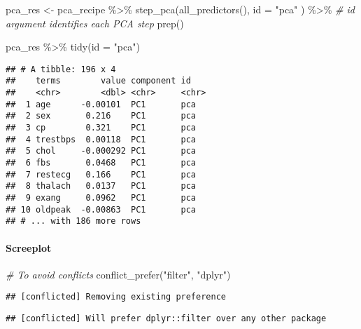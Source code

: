 \documentclass[
]{book}
\newenvironment{Shaded}{\begin{snugshade}}{\end{snugshade}}
\newcommand{\AttributeTok}[1]{\textcolor[rgb]{0.77,0.63,0.00}{#1}}
\newcommand{\CommentTok}[1]{\textcolor[rgb]{0.56,0.35,0.01}{\textit{#1}}}
\newcommand{\FunctionTok}[1]{\textcolor[rgb]{0.00,0.00,0.00}{#1}}
\newcommand{\NormalTok}[1]{#1}
\newcommand{\OtherTok}[1]{\textcolor[rgb]{0.56,0.35,0.01}{#1}}
\newcommand{\SpecialCharTok}[1]{\textcolor[rgb]{0.00,0.00,0.00}{#1}}
\newcommand{\StringTok}[1]{\textcolor[rgb]{0.31,0.60,0.02}{#1}}
\begin{document}
\begin{Shaded}
\begin{Highlighting}[]
\NormalTok{pca\_res }\OtherTok{\textless{}{-}}\NormalTok{ pca\_recipe }\SpecialCharTok{\%\textgreater{}\%}
  \FunctionTok{step\_pca}\NormalTok{(}\FunctionTok{all\_predictors}\NormalTok{(),}
    \AttributeTok{id =} \StringTok{"pca"}
\NormalTok{  ) }\SpecialCharTok{\%\textgreater{}\%} \CommentTok{\# id argument identifies each PCA step}
  \FunctionTok{prep}\NormalTok{()}

\NormalTok{pca\_res }\SpecialCharTok{\%\textgreater{}\%}
  \FunctionTok{tidy}\NormalTok{(}\AttributeTok{id =} \StringTok{"pca"}\NormalTok{)}
\end{Highlighting}
\end{Shaded}

\begin{verbatim}
## # A tibble: 196 x 4
##    terms        value component id   
##    <chr>        <dbl> <chr>     <chr>
##  1 age      -0.00101  PC1       pca  
##  2 sex       0.216    PC1       pca  
##  3 cp        0.321    PC1       pca  
##  4 trestbps  0.00118  PC1       pca  
##  5 chol     -0.000292 PC1       pca  
##  6 fbs       0.0468   PC1       pca  
##  7 restecg   0.166    PC1       pca  
##  8 thalach   0.0137   PC1       pca  
##  9 exang     0.0962   PC1       pca  
## 10 oldpeak  -0.00863  PC1       pca  
## # ... with 186 more rows
\end{verbatim}

\hypertarget{screeplot}{%
\paragraph{Screeplot}\label{screeplot}}

\begin{Shaded}
\begin{Highlighting}[]
\CommentTok{\# To avoid conflicts}
\FunctionTok{conflict\_prefer}\NormalTok{(}\StringTok{"filter"}\NormalTok{, }\StringTok{"dplyr"}\NormalTok{)}
\end{Highlighting}
\end{Shaded}

\begin{verbatim}
## [conflicted] Removing existing preference
\end{verbatim}

\begin{verbatim}
## [conflicted] Will prefer dplyr::filter over any other package
\end{verbatim}
\end{document}
